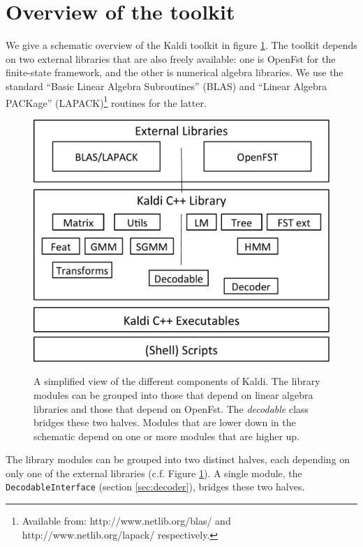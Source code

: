 \documentclass[10pt,conference,letterpaper]{IEEEtran}
\def \st {\small \tt}
\begin{document}
\section{Overview of the toolkit}
\label{sec:flavor}
We give a schematic overview of the Kaldi toolkit in figure \ref{fig:kaldi-lib}.
The toolkit depends on two external libraries that are also freely available: 
one is OpenFst \cite{openfst} for the finite-state framework, and the other is 
numerical algebra libraries. We use the standard ``Basic Linear Algebra 
Subroutines'' (BLAS)%
and ``Linear Algebra PACKage'' (LAPACK)\footnote{Available from: http://www.netlib.org/blas/ and http://www.netlib.org/lapack/ respectively.} 
routines for the latter.

\begin{figure}
  \begin{center}
    \includegraphics[width=0.75\columnwidth]{figs/kaldi-lib}\\
    \caption{A simplified view of the different components of Kaldi. The 
      library modules can be grouped into those that depend on linear algebra 
      libraries and those that depend on OpenFst. The {\em decodable} class 
      bridges these two halves. Modules that are lower down in the schematic 
      depend on one or more modules that are higher up.}
    \label{fig:kaldi-lib}
  \end{center}
\end{figure}

The library modules can be grouped into two distinct halves, each depending 
on only one of the external libraries (c.f. Figure \ref{fig:kaldi-lib}). A 
single module, the {\st DecodableInterface} (section \ref{sec:decoder}), 
bridges these two halves. 
\end{document}
